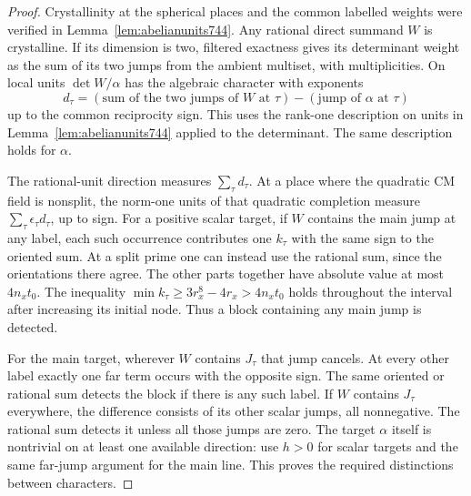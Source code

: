 \documentclass[a4paper,11pt]{article}
\theoremstyle{definition}
\theoremstyle{remark}
\numberwithin{equation}{section}
\begin{document}
\begin{proof}
Crystallinity at the spherical places and the common labelled
weights were verified in Lemma~\ref{lem:abelianunits744}.
Any rational direct summand \(W\) is crystalline. If its
dimension is two, filtered exactness gives its determinant
weight as the sum of its two jumps from the ambient multiset,
with multiplicities. On local units \(\det W/\alpha\) has
the algebraic character with exponents
\[
 d_\tau=(\text{sum of the two jumps of }W\text{ at }\tau)
                          -(\text{jump of }\alpha\text{ at }\tau)
\]
up to the common reciprocity sign. This uses the rank-one
description on units in Lemma~\ref{lem:abelianunits744} applied
to the determinant. The same description holds for \(\alpha\).

The rational-unit direction measures \(\sum_\tau d_\tau\).
At a place where the quadratic CM field is nonsplit, the
norm-one units of that quadratic completion measure
\(\sum_\tau\epsilon_\tau d_\tau\), up to sign. For a positive
scalar target, if \(W\) contains the main jump at any label,
each such occurrence contributes one \(k_\tau\) with the
same sign to the oriented sum. At a split prime one can instead
use the rational sum, since the orientations there agree.
The other parts together have absolute value at most
\(4n_xt_0\). The inequality
\(\min k_\tau\ge3r_x^8-4r_x>4n_xt_0\) holds throughout the
interval after increasing its initial node. Thus a block
containing any main jump is detected.

For the main target, wherever \(W\) contains \(J_\tau\) that
jump cancels. At every other label exactly one far term occurs
with the opposite sign. The same oriented or rational sum
detects the block if there is any such label. If \(W\) contains
\(J_\tau\) everywhere, the difference consists of its other
scalar jumps, all nonnegative. The rational sum detects it
unless all those jumps are zero. The target \(\alpha\) itself
is nontrivial on at least one available direction: use \(h>0\)
for scalar targets and the same far-jump argument for the main
line. This proves the required distinctions between characters.


\end{proof}
\end{document}
